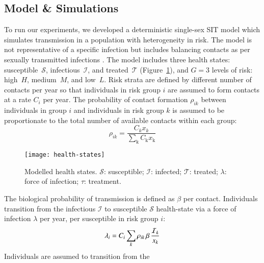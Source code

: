 \subsection{Model \& Simulations}\label{ss:model-sim}
To run our experiments,
we developed a deterministic single-sex SIT model
which simulates transmission in a population with heterogeneity in risk.
The model is not representative of a specific infection
but includes balancing contacts
as per sexually transmitted infections \citep{Garnett1994}.
The model includes three health states:
susceptible~$\mathcal{S}$, infectious~$\mathcal{I}$, and treated~$\mathcal{T}$
(Figure~\ref{fig:health-states}),
and $G = 3$ levels of risk:
high~$H$, medium~$M$, and low~$L$.
Risk strata are defined by different number of contacts per year
so that individuals in risk group $i$ are assumed to
form contacts at a rate $C_{i}$ per year.
The probability of contact formation $\rho_{ik}$ between individuals in group $i$
and individuals in risk group $k$ is assumed to be
proportionate to the total number of available contacts within each group:
\begin{equation}
  \rho_{ik} = \frac
    {C_k x_k}
    {\sum_{\mathrm{k}}C_{\mathrm{k}} x_{\mathrm{k}}}
    \label{eq:rho}
\end{equation}
\begin{figure}
  \centering
  \texttt{[image: health-states]}
  \caption{Modelled health states.
  $\mathcal{S}$: susceptible;
  $\mathcal{I}$: infected;
  $\mathcal{T}$: treated;
  $\lambda$: force of infection;
  $\tau$: treatment.}
  \label{fig:health-states}
\end{figure}
\par
The biological probability of transmission is defined as $\beta$ per contact.
Individuals transition from the
infectious $\mathcal{I}$ to susceptible $\mathcal{S}$ health-state
via a force of infection $\lambda$ per year, per susceptible in risk group $i$:
\begin{equation}
  \lambda_{i} =
  C_{i} \sum_k \rho_{ik} \thinspace  \beta \thinspace \frac{\mathcal{I}_k}{x_k}
  \label{eq:foi}
\end{equation}
Individuals are assumed to transition from the
